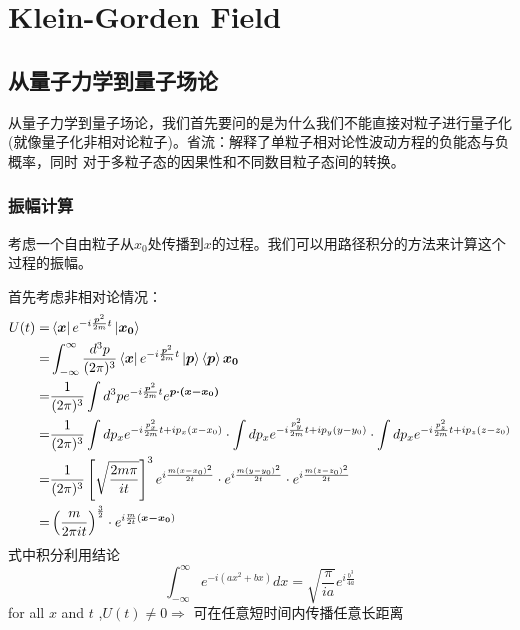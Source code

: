 \documentclass[../main.tex]{subfiles}
\begin{document}
\hypersetup{pageanchor=true}

\chapter{Klein-Gorden Field}
\section{从量子力学到量子场论}
从量子力学到量子场论，我们首先要问的是为什么我们不能直接对粒子进行量子化(就像量子化非相对论粒子)。省流：解释了单粒子相对论性波动方程的负能态与负概率，同时
对于多粒子态的因果性和不同数目粒子态间的转换。

\subsection{振幅计算}
    考虑一个自由粒子从$x_0$处传播到$x$的过程。我们可以用路径积分的方法来计算这个过程的振幅。

    首先考虑非相对论情况：
    \begin{align}
        U(t) = & \Bra{\bm{x}}  e^{-i\frac{\bm{p}^2}{2m}t}  \Ket{\bm{x_0}} \notag \\
             = & \int_{-\infty}^{\infty} \frac{d^3p}{(2\pi)^3} \Bra{\bm{x}} e^{-i\frac{\bm{p}^2}{2m}t} \Ket{\bm{p}} \Braket{\bm{p} }{\bm{x_0}} \notag \\
             = & \frac{1}{(2\pi)^3} \int d^3p e^{-i\frac{\bm{p}^2}{2m}t} e^{\bm{p \cdot (x-x_0) }} \notag \\
             = & \frac{1}{(2\pi)^3} \int dp_x e^{-i\frac{p_x^2}{2m}t + i p_x(x-x_0)} \cdot \int dp_x e^{-i\frac{p_y^2}{2m}t + i p_y(y-y_0)} \cdot \int dp_x e^{-i\frac{p_z^2}{2m}t + i p_z(z-z_0)} \notag \\
             = & \frac{1}{(2\pi)^3} \left[ \sqrt{ \frac{ 2m\pi}{ it}} \right]^3 e^{i\frac{m(x-x_0)^2}{2t}} \cdot e^{i\frac{m(y-y_0)^2}{2t}} \cdot e^{i\frac{m(z-z_0)^2}{2t}} \notag \\
             = & \left( \frac{m}{2\pi it} \right)^{\frac{3}{2}} \cdot e^{i \frac{m}{2t} (\bm{x-x_0})}
    \end{align}
    式中积分利用结论
    \begin{equation}
        \int_{-\infty}^{\infty} e^{-i(ax^2 + bx)} dx = \sqrt{\frac{\pi}{ia}}e^{i\frac{b^3}{4a}}
    \end{equation}
    for all $x$ and $t$ ,$U(t) \neq 0 \Rightarrow $ 可在任意短时间内传播任意长距离
\end{document}

